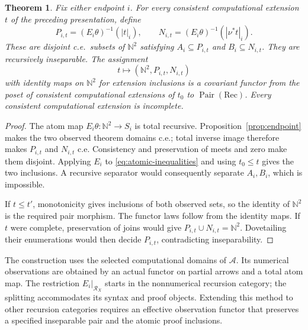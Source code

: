\documentclass[11pt]{article}
\newtheorem{theorem}{Theorem}[section]
\newcommand{\N}{\mathbb N}
\begin{document}
\begin{theorem}\label{thm:cosheaf-observation}
Fix either endpoint $i$. For every consistent computational
extension $t$ of the preceding presentation, define
\[
 P_{i,t}=(E_i\theta)^{-1}(|t|_i),\qquad
 N_{i,t}=(E_i\theta)^{-1}(|\nu^*t|_i).
\]
These are disjoint c.e.\ subsets of $\N^2$ satisfying
$A_i\subseteq P_{i,t}$ and $B_i\subseteq N_{i,t}$.
They are recursively inseparable. The assignment
\[
 t\longmapsto(\N^2,P_{i,t},N_{i,t})
\]
with identity maps on $\N^2$ for extension inclusions is a
covariant functor from the poset of consistent computational
extensions of $t_0$ to $\operatorname{Pair}(\mathrm{Rec})$.
Every consistent computational extension is incomplete.
\end{theorem}
\begin{proof}
The atom map $E_i\theta:\N^2\to S_i$ is total recursive.
Proposition~\ref{prop:endpoint} makes the two observed theorem
domains c.e.; total inverse image therefore makes $P_{i,t}$
and $N_{i,t}$ c.e. Consistency and preservation of meets and
zero make them disjoint. Applying $E_i$ to
\eqref{eq:atomic-inequalities} and using $t_0\le t$ gives
the two inclusions. A recursive separator would consequently
separate $A_i,B_i$, which is impossible.

If $t\le t'$, monotonicity gives inclusions of both observed
sets, so the identity of $\N^2$ is the required pair morphism.
The functor laws follow from the identity maps. If $t$ were
complete, preservation of joins would give
$P_{i,t}\cup N_{i,t}=\N^2$. Dovetailing their enumerations would
then decide $P_{i,t}$, contradicting inseparability.
\end{proof}

The construction uses the selected computational domains of
$\mathcal A$. Its numerical observations are obtained by an
actual functor on partial arrows and a total atom map.
The restriction $E_i|_{\mathscr R_X}$ starts in the nonnumerical
recursion category; the splitting accommodates its syntax and
proof objects. Extending this method to other recursion categories
requires an effective observation functor that preserves a specified
inseparable pair and the atomic proof inclusions.
\end{document}
